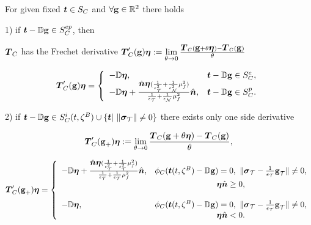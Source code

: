 \documentclass[12pt,a4paper]{scrbook}
\begin{document}
\begin{thm}\label{thm:ContactFunctionalDifferentiability} For given fixed $\bv{t}\in S_C$ and $\forall \bv{\gap}\in \R^{2}$ there holds

1) if $\bv{t}-\D \bv{\gap}\in S_C^{ep}$, then

$\bv{T}_{C}$ has the Frechet derivative $\bv{T}_{C}'(\bv{\gap})\bv{\eta}:=\Lim_{\theta\rightarrow 0} \frac{\bv{T}_{C}(\bv{\gap}+\theta\bv{\eta})-\bv{T}_{C}(\bv{\gap})}{\theta}$ 

\begin{equation}\label{DerivativeContactFunctionalEP}
\bv{T}_{C}'(\bv{\gap})\bv{\eta}=\left\{
\begin{array}{lc}
-\D \bv{\eta}, & \bv{t}-\D\bv{\gap}\in S_C^e, \\
-\D \bv{\eta}+\frac{ \hat{\bv{n}} \bv{\eta} (\frac{1}{\epsilon_{\ct}^2}+\frac{1}{\epsilon_{\cn}^2}\mu_{f}^2) }{ \frac{1}{\epsilon_{\ct}}+\frac{1}{\epsilon_{\cn}}\mu_{f}^2 }\hat{\bv{n}}, & \bv{t}-\D\bv{\gap}\in S_C^p.
\end{array}\right.
\end{equation}

2) if $\bv{t}-\D \bv{\gap}\in S_C^{i}(t,\zeta^{\sl})\cup\left\lbrace \bv{t} \middle|~\|\bv{\sigma}_{\ct}\|\neq 0\right\rbrace$  there exists only one side derivative

\begin{equation}
\bv{T}_{C}'(\bv{\gap}_{+})\bv{\eta}:=\Lim_{\theta\rightarrow 0}\frac{\bv{T}_{C}(\bv{\gap}+\theta\bv{\eta})-\bv{T}_{C}(\bv{\gap})}{\theta},
\end{equation}

\begin{equation}\nonumber
\bv{T}_{C}'(\bv{\gap}_{+})\bv{\eta}=\left\{
\begin{array}{lc}
-\D \bv{\eta}+\frac{ \hat{\bv{n}} \bv{\eta} (\frac{1}{\epsilon_{\ct}^2}+\frac{1}{\epsilon_{\ct}^2}\mu_{f}^2) }{ \frac{1}{\epsilon_{\ct}}+\frac{1}{\epsilon_{\ct}}\mu_{f}^2 }\hat{\bv{n}}, & \yieldf_{C}(\bv{t}(t,\zeta^{\sl})-\D \bv{\gap})=0, ~\|\bv{\sigma}_{\ct}-\frac{1}{\epsilon_{\ct}}\bv{\gap}_{\ct}\|\neq 0, \\
&  \bv{\eta}\hat{\bv{n}} \geq 0, \\[3ex]
-\D \bv{\eta} , & \yieldf_{C}(\bv{t}(t,\zeta^{\sl})-\D \bv{\gap})=0, ~\|\bv{\sigma}_{\ct}-\frac{1}{\epsilon_{\ct}}\bv{\gap}_{\ct}\|\neq 0, \\
&  \bv{\eta}\hat{\bv{n}} < 0.
\end{array}\right.
\end{equation}
\end{thm}
\end{document}
